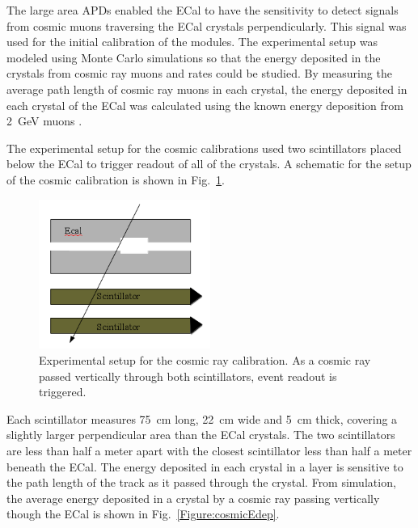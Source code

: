 The large area APDs enabled the ECal to have the sensitivity to detect signals from cosmic muons traversing the ECal crystals perpendicularly. This signal was used for the initial calibration of the modules. The experimental setup was modeled using Monte Carlo simulations so that the energy deposited in the crystals from cosmic ray muons and rates could be studied. By measuring the average path length of cosmic ray muons in each crystal, the energy deposited in each crystal of the ECal was calculated using the known energy deposition from 2~GeV muons \cite{Agashe:2014kda}. 

The experimental setup for the cosmic calibrations used two scintillators placed below the ECal to trigger readout of all of the crystals. A schematic for the setup of the cosmic calibration is shown in Fig.~\ref{Figure:cosmicScheme}.


\begin{figure}[htb]
  \centering
      \includegraphics[width=0.5\textwidth]{pics/performance/cosmicschematic.png}
  \caption[Setup for ECal cosmic ray calibration]{Experimental setup for the cosmic ray calibration. As a cosmic ray passed vertically through both scintillators, event readout is triggered.}
  \label{Figure:cosmicScheme}
\end{figure}

Each scintillator measures 75~cm long, 22~cm wide and 5~cm thick, covering a slightly larger perpendicular area than the ECal crystals. The two scintillators are less than half a meter apart with the closest scintillator less than half a meter beneath the ECal. The energy deposited in each crystal in a layer is sensitive to the path length of the track as it passed through the crystal. From simulation, the average energy deposited in a crystal by a cosmic ray passing vertically though the ECal is shown in Fig.~\ref{Figure:cosmicEdep}.

